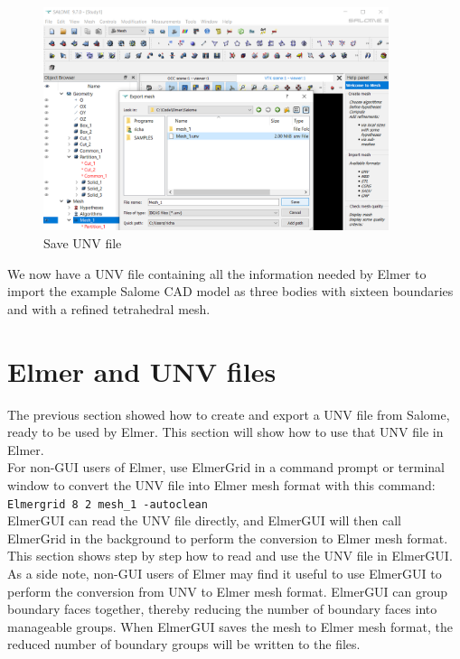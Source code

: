 \begin{figure}[H]
\centering
\includegraphics[width=0.9\textwidth]{Salome-30}
\caption{Save UNV file}\label{fg:salome-30}
\end{figure}

We now have a UNV file containing all the information needed by Elmer to import the example Salome CAD model as three bodies with sixteen boundaries and with a refined tetrahedral mesh.


\newpage

\section{Elmer and UNV files}

The previous section showed how to create and export a UNV file from Salome, ready to be used by Elmer.  This section will show how to use that UNV file in Elmer.\\

For non-GUI users of Elmer, use ElmerGrid in a command prompt or terminal window to convert the UNV file into Elmer mesh format with this command:\\

\texttt{Elmergrid 8 2 mesh\_1 -autoclean}\\

ElmerGUI can read the UNV file directly, and ElmerGUI will then call ElmerGrid in the background to perform the conversion to Elmer mesh format.  This section shows step by step how to read and use the UNV file in ElmerGUI.\\

As a side note, non-GUI users of Elmer may find it useful to use ElmerGUI to perform the conversion from UNV to Elmer mesh format.  ElmerGUI can group boundary faces together, thereby reducing the number of boundary faces into manageable groups.  When ElmerGUI saves the mesh to Elmer mesh format, the reduced number of boundary groups will be written to the files.

